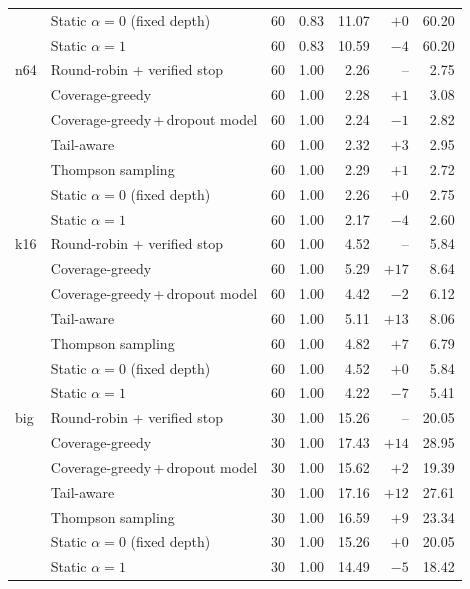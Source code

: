 \begin{table}[!t]
\begin{tabular}{@{}llrrrrr@{}}
 & Static $\alpha{=}0$ (fixed depth) & 60 & 0.83 & 11.07 & $+0$ & 60.20 \\
 & Static $\alpha{=}1$ & 60 & 0.83 & 10.59 & $-4$ & 60.20 \\
\midrule
n64 & Round-robin + verified stop & 60 & 1.00 & 2.26 & -- & 2.75 \\
 & Coverage-greedy & 60 & 1.00 & 2.28 & $+1$ & 3.08 \\
 & Coverage-greedy\,+\,dropout model & 60 & 1.00 & 2.24 & $-1$ & 2.82 \\
 & Tail-aware & 60 & 1.00 & 2.32 & $+3$ & 2.95 \\
 & Thompson sampling & 60 & 1.00 & 2.29 & $+1$ & 2.72 \\
 & Static $\alpha{=}0$ (fixed depth) & 60 & 1.00 & 2.26 & $+0$ & 2.75 \\
 & Static $\alpha{=}1$ & 60 & 1.00 & 2.17 & $-4$ & 2.60 \\
\midrule
k16 & Round-robin + verified stop & 60 & 1.00 & 4.52 & -- & 5.84 \\
 & Coverage-greedy & 60 & 1.00 & 5.29 & $+17$ & 8.64 \\
 & Coverage-greedy\,+\,dropout model & 60 & 1.00 & 4.42 & $-2$ & 6.12 \\
 & Tail-aware & 60 & 1.00 & 5.11 & $+13$ & 8.06 \\
 & Thompson sampling & 60 & 1.00 & 4.82 & $+7$ & 6.79 \\
 & Static $\alpha{=}0$ (fixed depth) & 60 & 1.00 & 4.52 & $+0$ & 5.84 \\
 & Static $\alpha{=}1$ & 60 & 1.00 & 4.22 & $-7$ & 5.41 \\
\midrule
big & Round-robin + verified stop & 30 & 1.00 & 15.26 & -- & 20.05 \\
 & Coverage-greedy & 30 & 1.00 & 17.43 & $+14$ & 28.95 \\
 & Coverage-greedy\,+\,dropout model & 30 & 1.00 & 15.62 & $+2$ & 19.39 \\
 & Tail-aware & 30 & 1.00 & 17.16 & $+12$ & 27.61 \\
 & Thompson sampling & 30 & 1.00 & 16.59 & $+9$ & 23.34 \\
 & Static $\alpha{=}0$ (fixed depth) & 30 & 1.00 & 15.26 & $+0$ & 20.05 \\
 & Static $\alpha{=}1$ & 30 & 1.00 & 14.49 & $-5$ & 18.42 \\
\bottomrule
\end{tabular}
\end{table}
